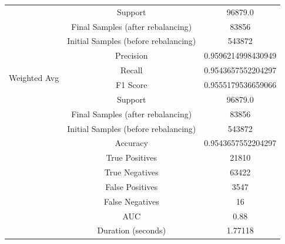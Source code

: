 \begin{longtable}{|c|c|c|}
 & Support & 96879.0 \\
 & Final Samples (after rebalancing) & 83856 \\
 & Initial Samples (before rebalancing) & 543872 \\
\hline
\multirow{4}{*}{Weighted Avg} & Precision & 0.9596214998430949 \\
 & Recall & 0.9543657552204297 \\
 & F1 Score & 0.9555179536659066 \\
 & Support & 96879.0 \\
 & Final Samples (after rebalancing) & 83856 \\
 & Initial Samples (before rebalancing) & 543872 \\
\hline
& Accuracy & 0.9543657552204297 \\ \hline
& True Positives & 21810 \\ \hline
& True Negatives & 63422 \\ \hline
& False Positives & 3547 \\ \hline
& False Negatives & 16 \\ \hline
& AUC & 0.88 \\ \hline
& Duration (seconds) & 1.77118 \\ \hline
\end{longtable}


